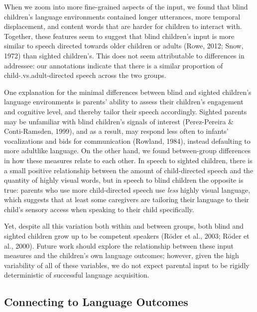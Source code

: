 \documentclass[
  man,floatsintext]{apa6}
\begin{document}
When we zoom into more fine-grained aspects of the input, we found that blind children's language environments contained longer utterances, more temporal displacement, and content words that are harder for children to interact with. Together, these features seem to suggest that blind children's input is more similar to speech directed towards older children or adults (Rowe, 2012; Snow, 1972) than sighted children's. This does not seem attributable to differences in addressee: our annotations indicate that there is a similar proportion of child-.vs.adult-directed speech across the two groups.

One explanation for the minimal differences between blind and sighted children's language environments is parents' ability to assess their children's engagement and cognitive level, and thereby tailor their speech accordingly. Sighted parents may be unfamiliar with blind children's signals of interest (Perez-Pereira \& Conti-Ramsden, 1999), and as a result, may respond less often to infants' vocalizations and bids for communication (Rowland, 1984), instead defaulting to more adultlike language. On the other hand, we found between-group differences in how these measures relate to each other. In speech to sighted children, there is a small positive relationship between the amount of child-directed speech and the quantity of highly visual words, but in speech to blind children the opposite is true: parents who use more child-directed speech use \emph{less} highly visual language, which suggests that at least some caregivers are tailoring their language to their child's sensory access when speaking to their child specifically.

Yet, despite all this variation both within and between groups, both blind and sighted children grow up to be competent speakers (Röder et al., 2003; Röder et al., 2000). Future work should explore the relationship between these input measures and the children's own language outcomes; however, given the high variability of all of these variables, we do not expect parental input to be rigidly deterministic of successful language acquisition.

\hypertarget{connecting-to-language-outcomes}{%
\subsection{Connecting to Language Outcomes}\label{connecting-to-language-outcomes}}
\end{document}
